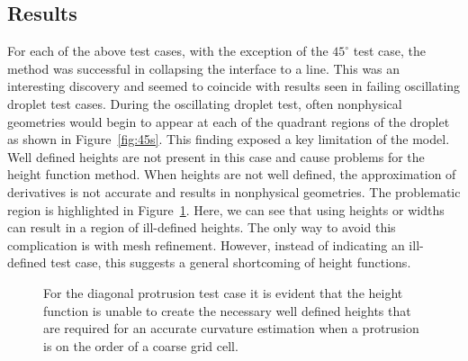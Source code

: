 \subsection{Results}
For each of the above test cases, with the exception of the $45^{\circ}$ test case, the method was successful in collapsing the interface to a line. This was an interesting discovery and seemed to coincide with results seen in failing oscillating droplet test cases. During the oscillating droplet test, often nonphysical geometries would begin to appear at each of the quadrant regions of the droplet as shown in Figure~\ref{fig:45s}. This finding exposed a key limitation of the model. Well defined heights are not present in this case and cause problems for the height function method. When heights are not well defined, the approximation of derivatives is not accurate and results in nonphysical geometries. The problematic region is highlighted in Figure~\ref{fig:probhts}. Here, we can see that using heights or widths can result in a region of ill-defined heights. The only way to avoid this complication is with mesh refinement. However, instead of indicating an ill-defined test case, this suggests a general shortcoming of height functions.
\begin{figure}
	\centering
	\caption{For the diagonal protrusion test case it is evident that the height function is unable to create the necessary well defined heights that are required for an accurate curvature estimation when a protrusion is on the order of a coarse grid cell.}
	\label{fig:probhts}
\end{figure}








